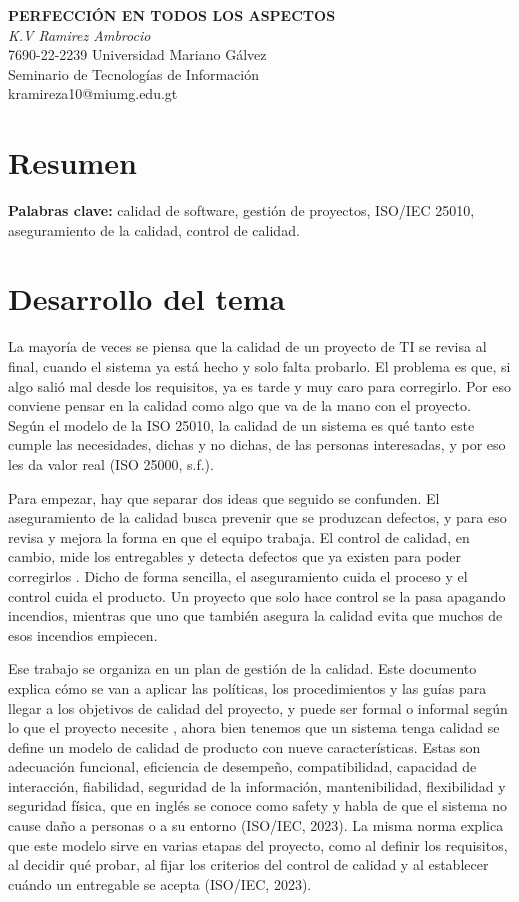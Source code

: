 \documentclass[12pt,letterpaper]{article}
\begin{document}
\begin{center}
{\bfseries PERFECCIÓN EN TODOS LOS ASPECTOS}\\[4pt]
\textit{K.V Ramirez Ambrocio}\\
7690-22-2239 \quad Universidad Mariano Gálvez\\
Seminario de Tecnologías de Información\\
kramireza10@miumg.edu.gt
\end{center}

\vspace{6pt}

\section*{Resumen}
  

\textbf{Palabras clave:} calidad de software, gestión de proyectos, ISO/IEC 25010, aseguramiento de la calidad, control de calidad.

\section*{Desarrollo del tema}

La mayoría de veces se piensa que la calidad de un proyecto de TI se revisa al final, cuando el sistema ya está hecho y solo falta probarlo. El problema es que, si algo salió mal desde los requisitos, ya es tarde y muy caro para corregirlo. Por eso conviene pensar en la calidad como algo que va de la mano  con el proyecto. Según el modelo de la ISO 25010, la calidad de un sistema es qué tanto este cumple las necesidades, dichas y no dichas, de las personas interesadas, y por eso les da valor real (ISO 25000, s.f.).

Para empezar, hay que separar dos ideas que seguido se confunden. El aseguramiento de la calidad busca prevenir que se produzcan defectos, y para eso revisa y mejora la forma en que el equipo trabaja. El control de calidad, en cambio, mide los entregables y detecta defectos que ya existen para poder corregirlos . Dicho de forma sencilla, el aseguramiento cuida el proceso y el control cuida el producto. Un proyecto que solo hace control se la pasa apagando incendios, mientras que uno que también asegura la calidad evita que muchos de esos incendios empiecen.

Ese trabajo se organiza en un plan de gestión de la calidad. Este documento explica cómo se van a aplicar las políticas, los procedimientos y las guías para llegar a los objetivos de calidad del proyecto, y puede ser formal o informal según lo que el proyecto necesite , ahora bien tenemos que un sistema tenga calidad se define un modelo de calidad de producto con nueve características. Estas son adecuación funcional, eficiencia de desempeño, compatibilidad, capacidad de interacción, fiabilidad, seguridad de la información, mantenibilidad, flexibilidad y seguridad física, que en inglés se conoce como safety y habla de que el sistema no cause daño a personas o a su entorno (ISO/IEC, 2023). La misma norma explica que este modelo sirve en varias etapas del proyecto, como al definir los requisitos, al decidir qué probar, al fijar los criterios del control de calidad y al establecer cuándo un entregable se acepta (ISO/IEC, 2023).
\end{document}
